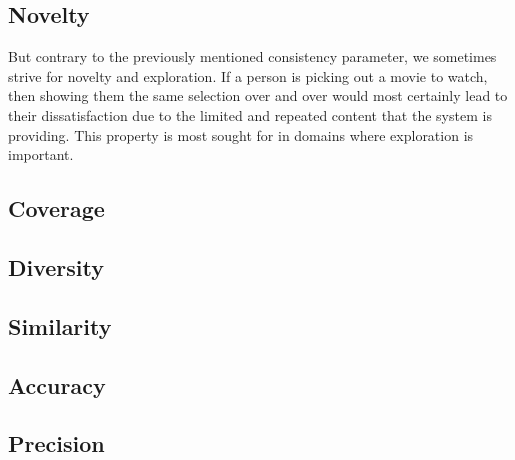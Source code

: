 \subsection{Novelty}
But contrary to the previously mentioned consistency parameter, we sometimes strive for novelty and exploration. If a person is picking out a movie to watch, then showing them the same selection over and over would most certainly lead to their dissatisfaction due to the limited and repeated content that the system is providing. This property is most sought for in domains where exploration is important.

\subsection{Coverage}
\subsection{Diversity}

\subsection{Similarity}
\subsection{Accuracy}
\subsection{Precision}




